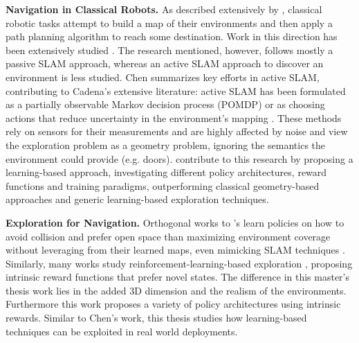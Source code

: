 \textbf{Navigation in Classical Robots.} %
As described extensively by \textcite{chen2019learning}, classical robotic tasks attempt to build a map of their environments and then apply a path planning algorithm to reach some destination. Work in this direction has been extensively studied \cite{zisserman2004multiple, thrun2002probabilistic, lavalle2006planning}. The research mentioned, however, follows mostly a passive SLAM approach, whereas an active SLAM approach to discover an environment is less studied. Chen summarizes key efforts in active SLAM, contributing to Cadena's \cite{cadena2016past} extensive literature: active SLAM has been formulated as a partially observable Markov decision process (POMDP) \cite{martinez2009bayesian} or as choosing actions that reduce uncertainty in the environment's mapping \cite{carrillo2012comparison}. These methods rely on sensors for their measurements and are highly affected by noise and view the exploration problem as a geometry problem, ignoring the semantics the environment could provide (e.g. doors). \textcite{chen2019learning} contribute to this research by proposing a learning-based approach, investigating different policy architectures, reward functions and training paradigms, outperforming classical geometry-based approaches and generic learning-based exploration techniques.

\textbf{Exploration for Navigation.} %
Orthogonal works \cite{gandhilearning, sadeghi2rl} to \textcite{chen2019learning}'s learn policies on how to avoid collision and prefer open space than maximizing environment coverage without leveraging from their learned maps, even mimicking SLAM techniques \cite{zhang2017neural}. Similarly, many works study reinforcement-learning-based exploration \cite{schmidhuber1991possibility, stadie2015incentivizing, pathak2017curiosity, fu2017ex2, lopes2012exploration, singh2005intrinsically}, proposing intrinsic reward functions that prefer novel states. 
The difference in this master's thesis work lies in the added 3D dimension and the realism of the environments. Furthermore this work proposes a variety of policy architectures using intrinsic rewards. Similar to Chen's work, this thesis studies how learning-based techniques can be exploited in real world deployments. 

